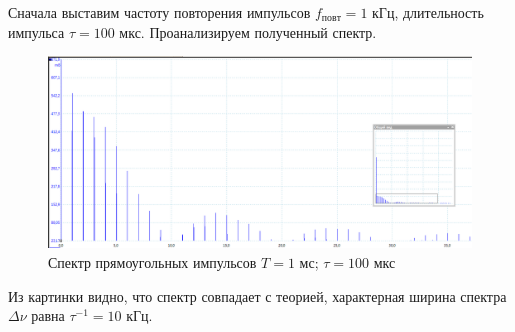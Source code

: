 \documentclass[a4paper,12pt]{article}
\begin{document}
Сначала выставим частоту повторения импульсов $f_{повт} = 1$ кГц, длительность импульса $\tau = 100$ мкс. Проанализируем полученный спектр. 
\begin{figure}[H]\label{fig: 1kHz100mks}
    \centering
    \includegraphics[width =\textwidth]{1kHz100mks.png}
    \caption{Спектр прямоугольных импульсов $T = 1$ мс; $\tau = 100$ мкс}
\end{figure}
Из картинки видно, что спектр совпадает с теорией, характерная ширина спектра $\Delta \nu$ равна $\tau^{-1} = 10$ кГц.
\end{document}
